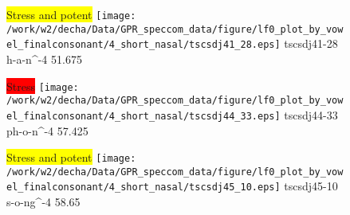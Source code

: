 \documentclass{article}
\begin{document}
\begin{figure}[t]
\begin{minipage}[b]{.24\textwidth}
\colorbox{yellow}{Stress and potent}
\centering
\texttt{[image: /work/w2/decha/Data/GPR\_speccom\_data/figure/lf0\_plot\_by\_vowel\_finalconsonant/4\_short\_nasal/tscsdj41\_28.eps]}
tscsdj41-28 h-a-n\textasciicircum-4 51.675
\end{minipage}
\begin{minipage}[b]{.24\textwidth}
\colorbox{red}{Stress}
\centering
\texttt{[image: /work/w2/decha/Data/GPR\_speccom\_data/figure/lf0\_plot\_by\_vowel\_finalconsonant/4\_short\_nasal/tscsdj44\_33.eps]}
tscsdj44-33 ph-o-n\textasciicircum-4 57.425
\end{minipage}
\begin{minipage}[b]{.24\textwidth}
\colorbox{yellow}{Stress and potent}
\centering
\texttt{[image: /work/w2/decha/Data/GPR\_speccom\_data/figure/lf0\_plot\_by\_vowel\_finalconsonant/4\_short\_nasal/tscsdj45\_10.eps]}
tscsdj45-10 s-o-ng\textasciicircum-4 58.65
\end{minipage}
\end{figure}
\end{document}

